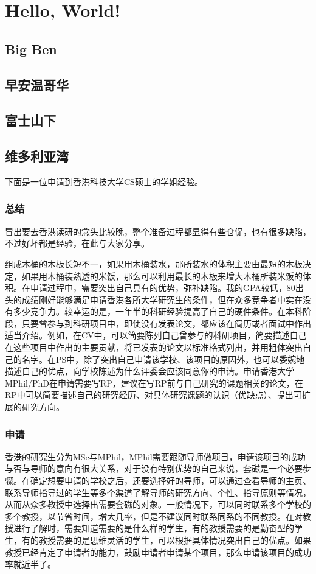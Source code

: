 \chapter{Hello, World!}
\newpage
\section{Big Ben}
\section{早安温哥华}
\section{富士山下}
\section{维多利亚湾}
下面是一位申请到香港科技大学CS硕士的学姐经验。

\subsection{总结}
冒出要去香港读研的念头比较晚，整个准备过程都显得有些仓促，也有很多缺陷，不过好坏都是经验，在此与大家分享。\par

组成木桶的木板长短不一，如果用木桶装水，那所装水的体积主要由最短的木板决定，如果用木桶装熟透的米饭，那么可以利用最长的木板来增大木桶所装米饭的体积。在申请过程中，需要突出自己具有的优势，弥补缺陷。我的GPA较低，80出头的成绩刚好能够满足申请香港各所大学研究生的条件，但在众多竞争者中实在没有多少竞争力。较幸运的是，一年半的科研经验提高了自己的硬件条件。在本科阶段，只要曾参与到科研项目中，即使没有发表论文，都应该在简历或者面试中作出适当介绍。例如，在CV中，可以简要陈列自己曾参与的科研项目，简要描述自己在这些项目中作出的主要贡献，将已发表的论文以标准格式列出，并用粗体突出自己的名字。在PS中，除了突出自己申请该学校、该项目的原因外，也可以委婉地描述自己的优点，向学校陈述为什么评委会应该同意你的申请。申请香港大学MPhil/PhD在申请需要写RP，建议在写RP前与自己研究的课题相关的论文，在RP中可以简要描述自己的研究经历、对具体研究课题的认识（优缺点）、提出可扩展的研究方向。\par

\subsection{申请}
香港的研究生分为MSc与MPhil，MPhil需要跟随导师做项目，申请该项目的成功与否与导师的意向有很大关系，对于没有特别优势的自己来说，套磁是一个必要步骤。在确定想要申请的学校之后，还要选择好的导师，可以通过查看导师的主页、联系导师指导过的学生等多个渠道了解导师的研究方向、个性、指导原则等情况，从而从众多教授中选择出需要套磁的对象。一般情况下，可以同时联系多个学校的多个教授，以节省时间，增大几率，但是不建议同时联系同系的不同教授。在对教授进行了解时，需要知道需要的是什么样的学生，有的教授需要的是勤奋型的学生，有的教授需要的是思维灵活的学生，可以根据具体情况突出自己的优点。如果教授已经肯定了申请者的能力，鼓励申请者申请某个项目，那么申请该项目的成功率就近半了。\par

